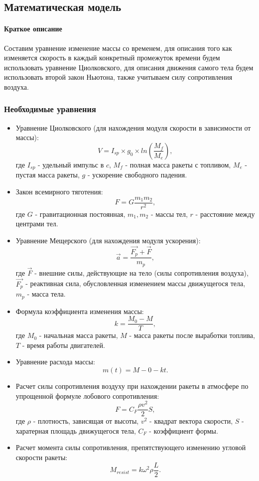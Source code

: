 \subsection{Математическая модель}
\paragraph{Краткое описание} Составим уравнение изменение массы со временем, для описания того как изменяется скорость в каждый конкретный промежуток времени будем использовать уравнение Циолковского, для описания движения самого тела будем использовать второй закон Ньютона, также учитываем силу сопротивления воздуха.

\subsubsection{Необходимые уравнения}
\begin{itemize}
	\item Уравнение Циолковского (для нахождения модуля скорости в зависимости от массы): \[V = I_{sp} \times g_0 \times ln(\frac{M_f}{M_e}),\] где $I_{sp}$ - удельный импульс в $c$,  $M_f$ - полная масса ракеты с топливом, $M_e$ - пустая масса ракеты, $g$ - ускорение свободного падения.
	\item Закон всемирного тяготения: \[F = G\frac{m_1 m_2}{r^2},\] где $G$ - гравитационная постоянная, $m_1, m_2$ - массы тел, $r$ - расстояние между центрами тел.
	\item Уравнение Мещерского (для нахождения модуля ускорения): \[\vec{a} = \frac{\vec{F_p} + \vec{F}}{m_p},\] где $\vec{F}$ - внешние силы, действующие на тело (силы сопротивления воздуха), $\vec{F_p}$ - реактивная сила, обусловленная изменением массы движущегося тела, $m_p$ - масса тела.
	\item Формула коэффициента изменения массы: \[k = \frac{M_0 - M}{T},\] где $M_0$ - начальная масса ракеты, $M$ - масса ракеты после выработки топлива, $T$ - время работы двигателей.
	\item Уравнение расхода массы: \[m(t) = M-0 - kt.\]
	\item Расчет силы сопротивления воздуху при нахождении ракеты в атмосфере по упрощенной формуле лобового сопротивления: \[F = C_F \frac{\rho v^2}{2}S,\] где $\rho$ - плотность, зависящая от высоты, $v^2$ - квадрат вектора скорости, $S$ - харатерная площадь движущегося тела, $C_F$ - коэффициент формы.
	\item Расчет момента силы сопротивления, препятствующего изменению угловой скорости ракеты: \[M_{resist} = k \omega^2 \rho \frac{L}{2}.\]
\end{itemize}


